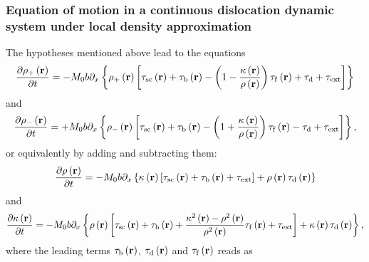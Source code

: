 \subsubsection{Equation of motion in a continuous dislocation dynamic system under local density approximation} \label{sec:EOM_LDA}
The hypotheses mentioned above lead to the equations
\begin{equation} \label{eq:EOM_LDA_rho}
\frac{{\partial {\rho _ + }\left( {\mathbf{r}} \right)}}{{\partial t}} =  - {M_0}b{\partial _x}\left\{ {{\rho _ + }\left( {\mathbf{r}} \right)\left[ {{\tau _{\rm{sc}}}\left( {\mathbf{r}} \right) + {\tau _{\rm{b}}}\left( {\mathbf{r}} \right) - \left( {1 - \frac{{\kappa \left( {\mathbf{r}} \right)}}{{\rho \left( {\mathbf{r}} \right)}}} \right){\tau _{\rm{f}}}\left( {\mathbf{r}} \right) + {\tau _{\rm{d}}} + {\tau _{{\text{ext}}}}} \right]} \right\}
\end{equation}
and
\begin{equation} \label{eq:EOM_LDA_kappa}
\frac{{\partial {\rho _ - }\left( {\mathbf{r}} \right)}}{{\partial t}} =  + {M_0}b{\partial _x}\left\{ {{\rho _ - }\left( {\mathbf{r}} \right)\left[ {{\tau _{\rm{sc}}}\left( {\mathbf{r}} \right) + {\tau _{\rm{b}}}\left( {\mathbf{r}} \right) - \left( {1 + \frac{{\kappa \left( {\mathbf{r}} \right)}}{{\rho \left( {\mathbf{r}} \right)}}} \right){\tau _{\rm{f}}}\left( {\mathbf{r}} \right) - {\tau _{\rm{d}}} + {\tau _{{\text{ext}}}}} \right]} \right\},
\end{equation}
or equivalently by adding and subtracting them:
\begin{equation}
\frac{{\partial \rho \left( {\mathbf{r}} \right)}}{{\partial t}} =  - {M_0}b{\partial _x}\left\{ {\kappa \left( {\mathbf{r}} \right)\left[ {{\tau _{{\rm{sc}}}}\left( {\mathbf{r}} \right) + {\tau _{\rm{b}}}\left( {\mathbf{r}} \right) + {\tau _{{\text{ext}}}}} \right] + \rho \left( {\mathbf{r}} \right){\tau _{\rm{d}}}\left( {\mathbf{r}} \right)} \right\}
\end{equation}
and
\begin{equation} \label{eq:pattern_eom_kappa}
\frac{{\partial \kappa \left( {\mathbf{r}} \right)}}{{\partial t}} =  - {M_0}b{\partial _x}\left\{ {\rho \left( {\mathbf{r}} \right)\left[ {{\tau _{{\rm{sc}}}}\left( {\mathbf{r}} \right) + {\tau _{\rm{b}}}\left( {\mathbf{r}} \right) + \frac{{{\kappa ^2}\left( {\mathbf{r}} \right) - {\rho ^2}\left( {\mathbf{r}} \right)}}{{{\rho ^2}\left( {\mathbf{r}} \right)}}{\tau _{\rm{f}}}\left( {\mathbf{r}} \right) + {\tau _{{\text{ext}}}}} \right] + \kappa \left( {\mathbf{r}} \right){\tau _{\rm{d}}}\left( {\mathbf{r}} \right)} \right\},
\end{equation}
where the leading terms ${{\tau _{\rm{b}}}\left( {\mathbf{r}} \right)}$, ${{\tau _{\rm{d}}}\left( {\mathbf{r}} \right)}$ and ${{\tau _{\rm{f}}}\left( {\mathbf{r}} \right)}$ reads as 

